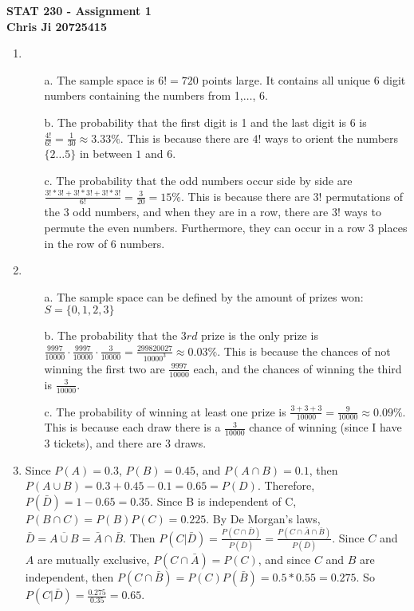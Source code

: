 \documentclass[10pt,english]{article}
\begin{document}
\noindent \begin{center}
\textbf{\large{}STAT 230 - Assignment 1}\\
\textbf{\large{}Chris Ji 20725415}
\par\end{center}{\large \par}
\medskip{}

\begin{enumerate}
\item\begin{enumerate}
    \item [a.] The sample space is $6!=720$ points large. It contains all unique 6 digit numbers containing the numbers from 1,$\ldots$, 6.
    \item [b.] The probability that the first digit is 1 and the last digit is 6 is $\frac{4!}{6!}=\frac{1}{30}\approx3.33\%$. This is because there are $4!$ ways to orient the numbers $\{2\ldots5\}$ in between $1$ and $6$. 
    \item [c.] The probability that the odd numbers occur side by side are $\frac{3!*3!+3!*3!+3!*3!}{6!}=\frac{3}{20}=15\%$. This is because there are $3!$ permutations of the 3 odd numbers, and when they are in a row, there are $3!$ ways to permute the even numbers. Furthermore, they can occur in a row 3 places in the row of 6 numbers.
\end{enumerate}

\pagebreak

\item\begin{enumerate}
    \item [a.] The sample space can be defined by the amount of prizes won: $S=\{0,1,2,3\}$
    \item [b.] The probability that the $3rd$ prize is the only prize is $\frac{9997}{10000}\cdot\frac{9997}{10000}\cdot\frac{3}{10000}=\frac{299820027}{10000^3}\approx0.03\%$. This is because the chances of not winning the first two are $\frac{9997}{10000}$ each, and the chances of winning the third is $\frac{3}{10000}$. 
    \item [c.] The probability of winning at least one prize is $\frac{3+3+3}{10000}=\frac{9}{10000}\approx 0.09\%$. This is because each draw there is a $\frac{3}{10000}$ chance of winning (since I have 3 tickets), and there are 3 draws. 
\end{enumerate}

\pagebreak

\item Since $P(A)=0.3$, $P(B)=0.45$, and $P(A\cap B)=0.1$, then $P(A\cup B)=0.3+0.45-0.1=0.65 = P(D)$. Therefore, $P(\bar D)=1-0.65 = 0.35$.  Since B is independent of C, $P(B\cap C)=P(B)P(C)=0.225$. By De Morgan's laws, $\bar D=\overline{A\cup B}=\bar A\cap \bar B$. Then $P(C|\bar D)=\frac{P(C\cap\bar D)}{P(\bar D)}=\frac{P(C\cap\bar A\cap\bar B)}{P(\bar D)}$. Since $C$ and $A$ are mutually exclusive, $P(C\cap \bar A)=P(C)$, and since $C$ and $B$ are independent, then $P(C\cap\bar B)=P(C)P(\bar B)= 0.5*0.55 = 0.275$. So $P(C|\bar D)=\frac{0.275}{0.35}=0.65$.  
\newpage


\end{enumerate}
\end{document}
